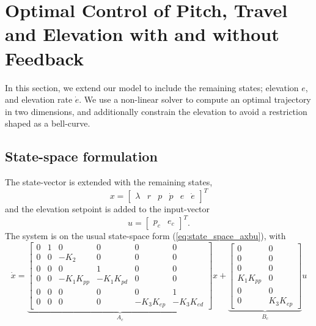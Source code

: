 \section{Optimal Control of Pitch, Travel and Elevation with and without Feedback}\label{sec:prob4}
In this section, we extend our model to include the remaining states; elevation $e$, and elevation
rate $\dot{e}$. We use a non-linear solver to compute an optimal trajectory in two dimensions,
and additionally constrain the elevation to avoid a restriction shaped as a bell-curve.

\subsection{State-space formulation}
The state-vector is extended with the remaining states,
\begin{equation}
\label{eq:day4_cost}
    x = \begin{bmatrix} \lambda & r & p & \dot{p} & e & \dot{e} \end{bmatrix}^T
\end{equation}
and the elevation setpoint is added to the input-vector
\begin{equation}
    u = \begin{bmatrix} p_c & e_c \end{bmatrix}^T.
\end{equation}
The system is on the usual state-space form (\ref{eq:state_space_axbu}), with
\begin{equation}
    \dot{x} =
    \underbrace{
    \begin{bmatrix}
    0 & 1 &      0     &      0     &      0     &      0    \\
    0 & 0 &    -K_2    &      0     &      0     &      0    \\
    0 & 0 &      0     &      1     &      0     &      0    \\
    0 & 0 & -K_1K_{pp} & -K_1K_{pd} &      0     &      0    \\
    0 & 0 &      0     &      0     &      0     &      1    \\
    0 & 0 &      0     &      0     & -K_3K_{ep} & -K_3K_{ed}
    \end{bmatrix}}_{A_c}
    x +
    \underbrace{
    \begin{bmatrix}
        0       &     0     \\
        0       &     0     \\
        0       &     0     \\
    K_1K_{pp}   &     0     \\
        0       &     0     \\
        0       & K_3K_{ep}
    \end{bmatrix}}_{B_c}
    u
    \label{eq:extended_state_space}
\end{equation}

